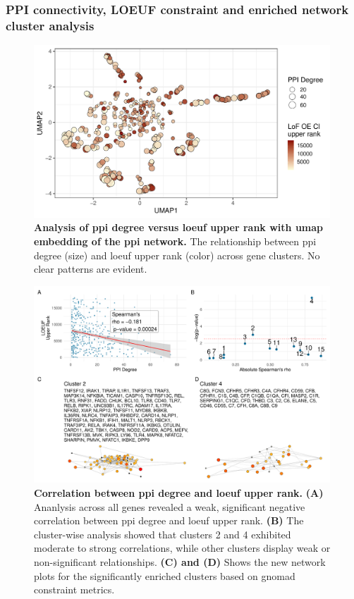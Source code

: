 \FloatBarrier
\clearpage
\subsubsection{PPI connectivity, LOEUF constraint and enriched network cluster analysis}

\begin{figure}[ht]
  \centering
  \includegraphics[width=0.99\textwidth]{../images/untangleR_ppi_network_p_umap_const.pdf}
  \caption{
   \textbf{Analysis of \ac{ppi} degree versus \ac{loeuf} upper rank with \ac{umap} embedding of the \ac{ppi} network.}
    The relationship between \ac{ppi} degree (size) and \ac{loeuf} upper rank (color) across gene clusters. No clear patterns are evident.
  }
  \label{fig:p_umap_const}
\end{figure}

\begin{figure}[ht]
  \centering
  \includegraphics[width=0.99\textwidth]{../images/untangleR_ppi_network_p_cor_spear_rho_sig_clust_patch3.pdf}
  \caption{
    \textbf{Correlation between \ac{ppi} degree and \ac{loeuf} upper rank.} 
    \textbf{(A)} Ananlysis across all genes revealed a weak, significant negative correlation between \ac{ppi} degree and \ac{loeuf} upper rank. \textbf{(B)} The cluster-wise analysis showed that clusters 2 and 4 exhibited moderate to strong correlations, while other clusters display weak or non-significant relationships. \textbf{(C) and (D)} Shows the new network plots for the significantly enriched clusters based on \ac{gnomad} constraint metrics.
  }
  \label{fig:p_cor_spear_rho_sig_clust_patch3}
\end{figure}

